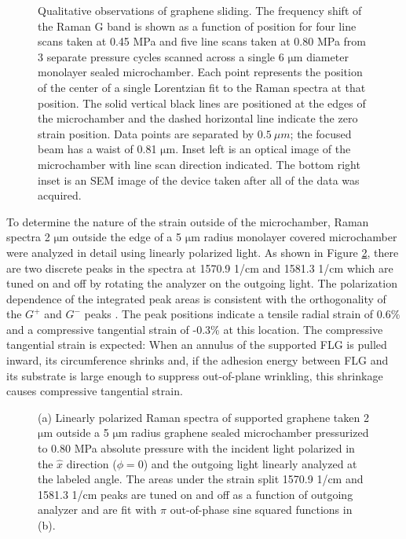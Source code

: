 \begin{figure}
	\begin{center}
	
	\end{center}
	\caption[Qualitative observations of graphene sliding]{\label{fig:fri:qualresults}
	Qualitative observations of graphene sliding.
	The frequency shift of the Raman G band is shown as a function of position for four line scans taken at 0.45 MPa and five line scans taken at 0.80 MPa from 3 separate pressure cycles scanned across a single 6 $\mathrm{\mu}$m diameter monolayer sealed microchamber.
	Each point represents the position of the center of a single Lorentzian fit to the Raman spectra at that position.
	The solid vertical black lines are positioned at the edges of the microchamber and the dashed horizontal line indicate the zero strain position.
	Data points are separated by $0.5 \ \mu m$; the focused beam has a waist of 0.81 $\mathrm{\mu}$m.
	Inset left is an optical image of the microchamber with line scan direction indicated.
	The bottom right inset is an SEM image of the device taken after all of the data was acquired.}
\end{figure}

To determine the nature of the strain outside of the microchamber, Raman spectra 2 $\mathrm{\mu}$m outside the edge of a 5 $\mathrm{\mu}$m radius monolayer covered microchamber were analyzed in detail using linearly polarized light.
As shown in Figure \ref{fig:fri:qualout}, there are two discrete peaks in the spectra at 1570.9 1/cm and 1581.3 1/cm which are tuned on and off by rotating the analyzer on the outgoing light.
The polarization dependence of the integrated peak areas is consistent with the orthogonality of the $G^+$ and $G^-$ peaks \cite{Huang2009}.
The peak positions indicate a tensile radial strain of 0.6\% and a compressive tangential strain of -0.3\% at this location.
The compressive tangential strain is expected: When an annulus of the supported FLG is pulled inward, its circumference shrinks and, if the adhesion energy between FLG and its substrate is large enough to suppress out-of-plane wrinkling, this shrinkage causes compressive tangential strain.

\begin{figure}
	\begin{center}
	
	\end{center}
	\caption[Discrimination of strain split Raman modes using linearly polarized light]{\label{fig:fri:qualout}
	(a) Linearly polarized Raman spectra of supported graphene taken 2 $\mathrm{\mu}$m outside a 5 $\mathrm{\mu}$m radius graphene sealed microchamber pressurized to 0.80 MPa absolute pressure with the incident light polarized in the $\hat x$ direction ($\phi=0$) and the outgoing light linearly analyzed at the labeled angle.
	The areas under the strain split 1570.9 1/cm and 1581.3 1/cm peaks are tuned on and off as a function of outgoing analyzer and are fit with $\pi$ out-of-phase sine squared functions in (b).}
\end{figure}

